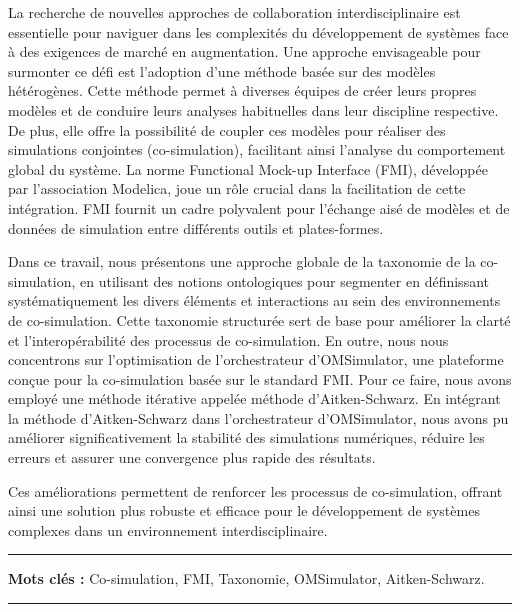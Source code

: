 
La recherche de nouvelles approches de collaboration interdisciplinaire est essentielle pour naviguer dans les complexités du développement de systèmes face à des exigences de marché en augmentation. Une approche envisageable pour surmonter ce défi est l'adoption d'une méthode basée sur des modèles hétérogènes. Cette méthode permet à diverses équipes de créer leurs propres modèles et de conduire leurs analyses habituelles dans leur discipline respective. De plus, elle offre la possibilité de coupler ces modèles pour réaliser des simulations conjointes (co-simulation), facilitant ainsi l'analyse du comportement global du système. La norme Functional Mock-up Interface (FMI), développée par l'association Modelica, joue un rôle crucial dans la facilitation de cette intégration. FMI fournit un cadre polyvalent pour l'échange aisé de modèles et de données de simulation entre différents outils et plates-formes.
\medskip

Dans ce travail, nous présentons une approche globale de la taxonomie de la co-simulation, en utilisant des notions ontologiques pour segmenter en définissant systématiquement les divers éléments et interactions au sein des environnements de co-simulation. Cette taxonomie structurée sert de base pour améliorer la clarté et l'interopérabilité des processus de co-simulation. En outre, nous nous concentrons sur l'optimisation de l'orchestrateur d'OMSimulator, une plateforme conçue pour la co-simulation basée sur le standard FMI. Pour ce faire, nous avons employé une méthode itérative appelée méthode d'Aitken-Schwarz. En intégrant la méthode d'Aitken-Schwarz dans l'orchestrateur d'OMSimulator, nous avons pu améliorer significativement la stabilité des simulations numériques, réduire les erreurs et assurer une convergence plus rapide des résultats.
\medskip

Ces améliorations permettent de renforcer les processus de co-simulation, offrant ainsi une solution plus robuste et efficace pour le développement de systèmes complexes dans un environnement interdisciplinaire.

\medskip




\vspace{1cm}


\noindent\rule[2pt]{\textwidth}{0.5pt}

{\textbf{Mots clés :}}
Co-simulation, FMI, Taxonomie, OMSimulator, Aitken-Schwarz.
\\
\noindent\rule[2pt]{\textwidth}{0.5pt}

